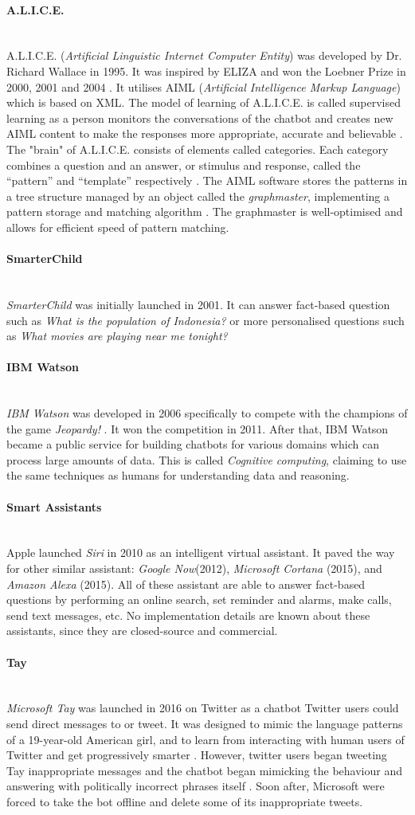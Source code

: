 \documentclass[12pt,a4paper]{article}
\newcommand{\myparagraph}[1]{\paragraph{#1}\mbox{}\\}
\begin{document}
\myparagraph{A.L.I.C.E.}
A.L.I.C.E. (\textit{Artificial Linguistic Internet Computer Entity}) was developed by Dr. Richard Wallace in 1995. It was inspired by ELIZA and won the Loebner Prize in 2000, 2001 and 2004 \cite[p.~182]{Wallace2009}. It utilises AIML (\textit{Artificial Intelligence Markup Language}) which is based on XML. The model of learning of A.L.I.C.E. is called supervised learning as a person monitors the conversations of the chatbot and creates new AIML content to make the responses more appropriate, accurate and believable \cite[p.~182]{Wallace2009}. The "brain" of A.L.I.C.E. consists of elements called categories. Each category combines a question and an answer, or stimulus and response, called the \enquote{pattern} and \enquote{template} respectively \cite[p.~182]{Wallace2009}. The AIML software stores the patterns in a tree structure managed by an object called the \textit{graphmaster}, implementing a pattern storage and matching algorithm \cite[p.~182]{Wallace2009}. The graphmaster is well-optimised and allows for efficient speed of pattern matching.

\myparagraph{SmarterChild}
\textit{SmarterChild} was initially launched in 2001. It can answer fact-based question such as \textit{What is the population of Indonesia?} or more personalised questions such as \textit{What movies are playing near me tonight?} \cite{SmarterChild:online}

\myparagraph{IBM Watson}
\textit{IBM Watson} was developed in 2006 specifically to compete with the champions of the game \textit{Jeopardy!} \cite{futurism:online}. It won the competition in 2011. After that, IBM Watson became a public service for building chatbots for various domains which can process large amounts of data. This is called \textit{Cognitive computing}, claiming to use the same techniques as humans for understanding data and reasoning.

\myparagraph{Smart Assistants}
Apple launched \textit{Siri} in 2010 as an intelligent virtual assistant. It paved the way for other similar assistant: \textit{Google Now}(2012), \textit{Microsoft Cortana} (2015), and \textit{Amazon Alexa} (2015). All of these assistant are able to answer fact-based questions by performing an online search, set reminder and alarms, make calls, send text messages, etc.
No implementation details are known about these assistants, since they are closed-source and commercial.

\myparagraph{Tay}
\textit{Microsoft Tay} was launched in 2016 \cite{Taytweet55:online} on Twitter as a chatbot Twitter users could send direct messages to or tweet. It was designed to mimic the language patterns of a 19-year-old American girl, and to learn from interacting with human users of Twitter and get progressively smarter \cite{Microsof8:online}. However, twitter users began tweeting Tay inappropriate messages and the chatbot began mimicking the behaviour and answering with politically incorrect phrases itself \cite{Microsof8:online}. Soon after, Microsoft were forced to take the bot offline and delete some of its inappropriate tweets.
\end{document}
